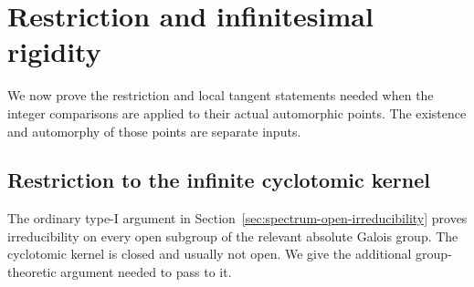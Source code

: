 \section{Restriction and infinitesimal rigidity}
\label{sec:sr-restriction-rigidity}
We now prove the restriction and local tangent statements needed when
the integer comparisons are applied to their actual automorphic points.
The existence and automorphy of those points are separate inputs.


\subsection{Restriction to the infinite cyclotomic kernel}
\label{sec:sr-cyclotomic-restriction}
The ordinary type-I argument in
Section~\ref{sec:spectrum-open-irreducibility} proves irreducibility
on every open subgroup of the relevant absolute Galois group.
The cyclotomic kernel is closed and usually not open.
We give the additional group-theoretic argument needed to pass to it.

